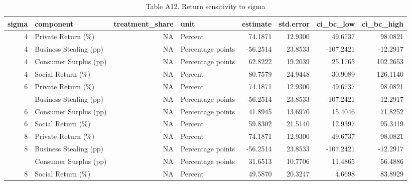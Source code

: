 \begin{table}

\caption{Table A12. Return sensitivity to sigma}
\centering
\begin{tabular}[t]{rlrlrrrr}
\toprule
sigma & component & treatment\_share & unit & estimate & std.error & ci\_bc\_low & ci\_bc\_high\\
\midrule
4 & Private Return (\%) & NA & Percent & 74.1871 & 12.9300 & 49.6737 & 98.0821\\
4 & Business Stealing (pp) & NA & Percentage points & -56.2514 & 23.8533 & -107.2421 & -12.2917\\
4 & Consumer Surplus (pp) & NA & Percentage points & 62.8222 & 19.2039 & 25.1765 & 102.2653\\
4 & Social Return (\%) & NA & Percent & 80.7579 & 24.9448 & 30.9089 & 126.1140\\
6 & Private Return (\%) & NA & Percent & 74.1871 & 12.9300 & 49.6737 & 98.0821\\
\addlinespace
6 & Business Stealing (pp) & NA & Percentage points & -56.2514 & 23.8533 & -107.2421 & -12.2917\\
6 & Consumer Surplus (pp) & NA & Percentage points & 41.8945 & 13.6970 & 15.4046 & 71.8252\\
6 & Social Return (\%) & NA & Percent & 59.8302 & 21.5140 & 12.9397 & 95.3419\\
8 & Private Return (\%) & NA & Percent & 74.1871 & 12.9300 & 49.6737 & 98.0821\\
8 & Business Stealing (pp) & NA & Percentage points & -56.2514 & 23.8533 & -107.2421 & -12.2917\\
\addlinespace
8 & Consumer Surplus (pp) & NA & Percentage points & 31.6513 & 10.7706 & 11.4865 & 56.4886\\
8 & Social Return (\%) & NA & Percent & 49.5870 & 20.3247 & 4.6698 & 83.8929\\
\bottomrule
\end{tabular}
\end{table}

